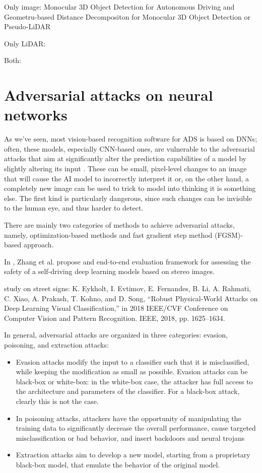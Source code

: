 Only image: Monocular 3D Object Detection for Autonomous Driving and Geometru-based Distance Decompositon for Monocular 3D Object Detection or Pseudo-LiDAR

Only LiDAR: 

Both:





\newpage
\section{Adversarial attacks on neural networks}
As we've seen, most vision-based recognition software for ADS is based on DNNs; often, these models, especially CNN-based ones, are vulnerable to the adversarial attacks that aim at significantly alter the prediction capabilities of a model by slightly altering its input \cite{DBLP:journals/corr/GoodfellowSS14}.
These can be small, pixel-level changes to an image that will cause the AI model to incorrectly interpret it or, on the other hand, a completely new image can be used to trick to model into thinking it is something else. The first kind is particularly dangerous, since such changes can be invisible to the human eye, and thus harder to detect.





There are mainly two categories of methods to achieve adversarial attacks, namely, optimization-based methods and fast gradient step method (FGSM)-based approach.


In \cite{DBLP:journals/iotj/ZhangLWWLJ22}, Zhang et al. propose and end-to-end evaluation framework for assessing the safety of a self-driving deep learning models based on stereo images.



study on street signs: K. Eykholt, I. Evtimov, E. Fernandes, B. Li, A. Rahmati, C. Xiao,
A. Prakash, T. Kohno, and D. Song, “Robust Physical-World Attacks on
Deep Learning Visual Classification,” in 2018 IEEE/CVF Conference on
Computer Vision and Pattern Recognition. IEEE, 2018, pp. 1625–1634.


In general, adversarial attacks are organized in three categories: evasion, poisoning, and extraction attacks:
\begin{itemize}
    \item Evasion attacks modify the input to a classifier such that it is misclassified, while keeping the modification as small as possible. Evasion attacks can be black-box or white-box: in the white-box case, the attacker has full access to the architecture and parameters of the classifier. For a black-box attack, clearly this is not the case.
    \item In poisoning attacks, attackers have the opportunity of manipulating the training data to significantly decrease the overall performance, cause targeted misclassification or bad behavior, and insert backdoors and neural trojans
    \item Extraction attacks aim to develop a new model, starting from a proprietary black-box model, that emulate the behavior of the original model.
\end{itemize}
